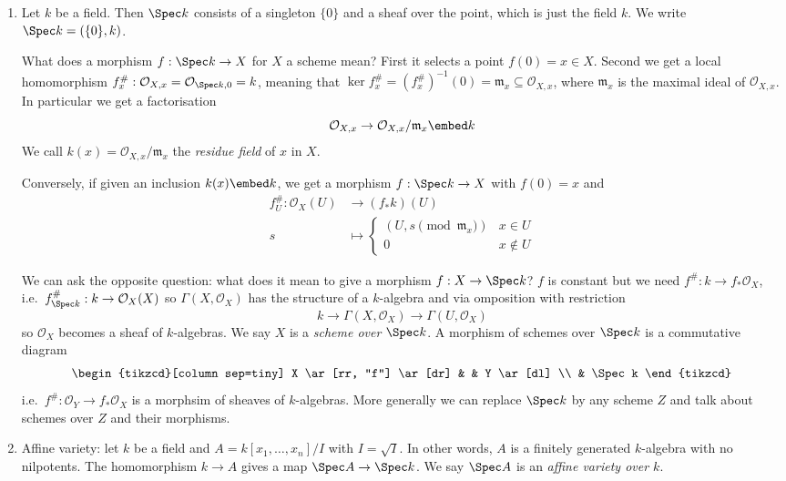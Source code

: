 \documentclass[a4paper]{article}
\newcommand{\sh}[1]{\mathcal{#1}} %
\begin{document}
\begin{eg}\leavevmode
  \begin{enumerate}
  \item Let \(k\) be a field. Then \(\Spec k\) consists of a singleton \(\{0\}\) and a sheaf over the point, which is just the field \(k\). We write \(\Spec k = (\{0\}, k)\).

    What does a morphism \(f: \Spec k \to X\) for \(X\) a scheme mean? First it selects a point \(f(0) = x \in X\). Second we get a local homomorphism \(f_x^\#: \sh O_{X, x} = \sh O_{\Spec k, 0} = k\), meaning that \(\ker f_x^\# = (f_x^\#)^{-1}(0) = \mathfrak m_x \subseteq \sh O_{X, x}\), where \(\mathfrak m_x\) is the maximal ideal of \(\sh O_{X, x}\). In particular we get a factorisation
    \[
      \sh O_{X, x} \to \sh O_{X, x}/\mathfrak m_x \embed k
    \]
    We call \(k(x) = \sh O_{X, x}/\mathfrak m_x\) the \emph{residue field} of \(x\) in \(X\).

    Conversely, if given an inclusion \(k(x) \embed k\), we get a morphism \(f: \Spec k \to X\) with \(f(0) = x\) and
    \begin{align*}
      f_U^\#: \sh O_X(U) &\to (f_* k)(U) \\
      s &\mapsto
          \begin{cases}
            (U, s \pmod{\mathfrak m_x}) & x \in U \\
            0 & x \notin U
          \end{cases}
    \end{align*}

    We can ask the opposite question: what does it mean to give a morphism \(f: X \to \Spec k\)? \(f\) is constant but we need \(f^\#: k \to f_* \sh O_X\), i.e.\ \(f^\#_{\Spec k}: k \to \sh O_X(X)\) so \(\Gamma(X, \sh O_X)\) has the structure of a \(k\)-algebra and via omposition with restriction
    \[
      k \to \Gamma(X, \sh O_X) \to \Gamma(U, \sh O_X)
    \]
    so \(\sh O_X\) becomes a sheaf of \(k\)-algebras. We say \(X\) is a \emph{scheme over \(\Spec k\)}. A morphism of schemes over \(\Spec k\) is a commutative diagram
    \[
      \begin{tikzcd}[column sep=tiny]
        X \ar[rr, "f"] \ar[dr] & & Y \ar[dl] \\
        & \Spec k
      \end{tikzcd}
    \]
    i.e.\ \(f^\#: \sh O_Y \to f_* \sh O_X\) is a morphsim of sheaves of \(k\)-algebras. More generally we can replace \(\Spec k\) by any scheme \(Z\) and talk about schemes over \(Z\) and their morphisms.
  \item Affine variety: let \(k\) be a field and \(A = k[x_1, \dots, x_n]/I\) with \(I = \sqrt I\). In other words, \(A\) is a finitely generated \(k\)-algebra with no nilpotents. The homomorphism \(k \to A\) gives a map \(\Spec A \to \Spec k\). We say \(\Spec A\) is an \emph{affine variety over \(k\)}.


\end{enumerate}
\end{eg}
\end{document}
